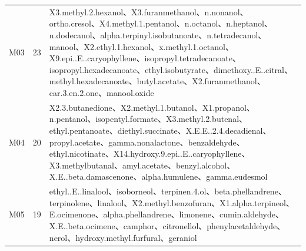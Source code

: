 \begin{longtable}{@{}l r p{}@{}}
M03 & 23 & X3.\allowbreak{}methyl.\allowbreak{}2.\allowbreak{}hexanol、X3.\allowbreak{}furanmethanol、n.\allowbreak{}nonanol、ortho.\allowbreak{}cresol、X4.\allowbreak{}methyl.\allowbreak{}1.\allowbreak{}pentanol、n.\allowbreak{}octanol、n.\allowbreak{}heptanol、n.\allowbreak{}dodecanol、alpha.\allowbreak{}terpinyl.\allowbreak{}isobutanoate、n.\allowbreak{}tetradecanol、manool、X2.\allowbreak{}ethyl.\allowbreak{}1.\allowbreak{}hexanol、x.\allowbreak{}methyl.\allowbreak{}1.\allowbreak{}octanol、X9.\allowbreak{}epi.\allowbreak{}.\allowbreak{}E.\allowbreak{}.\allowbreak{}caryophyllene、isopropyl.\allowbreak{}tetradecanoate、isopropyl.\allowbreak{}hexadecanoate、ethyl.\allowbreak{}isobutyrate、dimethoxy.\allowbreak{}.\allowbreak{}E.\allowbreak{}.\allowbreak{}citral、methyl.\allowbreak{}hexadecanoate、butyl.\allowbreak{}acetate、X2.\allowbreak{}furanmethanol、car.\allowbreak{}3.\allowbreak{}en.\allowbreak{}2.\allowbreak{}one、manool.\allowbreak{}oxide \\
M04 & 20 & X2.\allowbreak{}3.\allowbreak{}butanedione、X2.\allowbreak{}methyl.\allowbreak{}1.\allowbreak{}butanol、X1.\allowbreak{}propanol、n.\allowbreak{}pentanol、isopentyl.\allowbreak{}formate、X3.\allowbreak{}methyl.\allowbreak{}2.\allowbreak{}butenal、ethyl.\allowbreak{}pentanoate、diethyl.\allowbreak{}succinate、X.\allowbreak{}E.\allowbreak{}E.\allowbreak{}.\allowbreak{}2.\allowbreak{}4.\allowbreak{}decadienal、propyl.\allowbreak{}acetate、gamma.\allowbreak{}nonalactone、benzaldehyde、ethyl.\allowbreak{}nicotinate、X14.\allowbreak{}hydroxy.\allowbreak{}9.\allowbreak{}epi.\allowbreak{}.\allowbreak{}E.\allowbreak{}.\allowbreak{}caryophyllene、X3.\allowbreak{}methylbutanal、amyl.\allowbreak{}acetate、benzyl.\allowbreak{}alcohol、X.\allowbreak{}E.\allowbreak{}.\allowbreak{}beta.\allowbreak{}damascenone、alpha.\allowbreak{}humulene、gamma.\allowbreak{}eudesmol \\
M05 & 19 & ethyl.\allowbreak{}.\allowbreak{}E.\allowbreak{}.\allowbreak{}linalool、isoborneol、terpinen.\allowbreak{}4.\allowbreak{}ol、beta.\allowbreak{}phellandrene、terpinolene、linalool、X2.\allowbreak{}methyl.\allowbreak{}benzofuran、X1.\allowbreak{}alpha.\allowbreak{}terpineol、E.\allowbreak{}ocimenone、alpha.\allowbreak{}phellandrene、limonene、cumin.\allowbreak{}aldehyde、X.\allowbreak{}E.\allowbreak{}.\allowbreak{}beta.\allowbreak{}ocimene、camphor、citronellol、phenylacetaldehyde、nerol、hydroxy.\allowbreak{}methyl.\allowbreak{}furfural、geraniol \\

\end{longtable}
